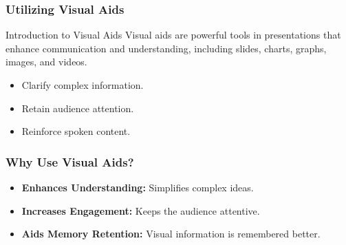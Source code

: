 \documentclass[aspectratio=169]{beamer}
\begin{document}
\begin{frame}[fragile]
    \frametitle{Utilizing Visual Aids}
    
    \begin{block}{Introduction to Visual Aids}
        Visual aids are powerful tools in presentations that enhance communication and understanding, including slides, charts, graphs, images, and videos.
    \end{block}
    
    \begin{itemize}
        \item Clarify complex information.
        \item Retain audience attention.
        \item Reinforce spoken content.
    \end{itemize}
\end{frame}

\begin{frame}[fragile]
    \frametitle{Why Use Visual Aids?}
    
    \begin{itemize}
        \item \textbf{Enhances Understanding:} Simplifies complex ideas.
        \item \textbf{Increases Engagement:} Keeps the audience attentive.
        \item \textbf{Aids Memory Retention:} Visual information is remembered better.
    \end{itemize}
\end{frame}
\end{document}
